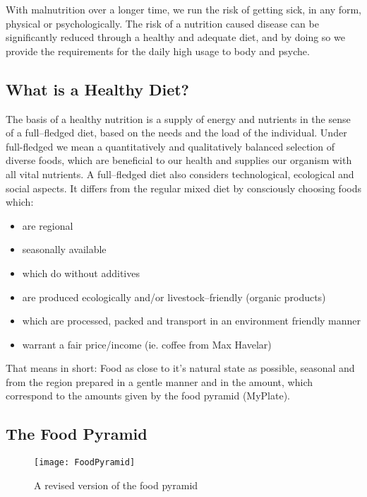 \documentclass[../main.tex]{subfiles}
\begin{document}
With malnutrition over a longer time, we run the risk of getting sick, in any form, physical or psychologically.
The risk of a nutrition caused disease can be significantly reduced through a  healthy and adequate diet,
and by doing so we provide the requirements for the daily high usage to body and psyche.

\subsection{What is a Healthy Diet?}

The basis of a healthy nutrition is a supply of energy and nutrients in the sense of a full--fledged diet,
based on the needs and the load of the individual.
Under full-fledged we mean a quantitatively and qualitatively balanced selection of diverse foods,
which are beneficial to our health and supplies our organism with all vital nutrients.
A full--fledged diet also considers technological, ecological and social aspects.
It differs from the regular mixed diet by consciously choosing foods which:
\begin{itemize}
\item are regional
\item seasonally available
\item which do without additives
\item are produced ecologically and/or livestock--friendly (organic products)
\item which are processed, packed and transport in an environment friendly manner
  \item warrant a fair price/income (ie. coffee from Max Havelar)
  \end{itemize}

  That means in short: Food as close to it's natural state as possible, seasonal and from the region
  prepared in a gentle manner and in the amount, which correspond to the amounts given by the food pyramid (MyPlate).

  \subsection{The Food Pyramid}

  
\begin{figure}[htb!]
\centering
  \texttt{[image: FoodPyramid]}
  \caption{A revised version of the food pyramid~\cite{FoodPyramid}}
\end{figure}
\end{document}
